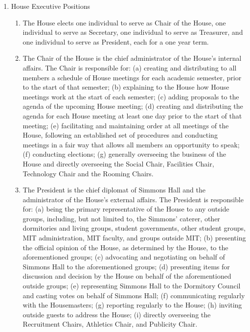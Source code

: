 \documentclass[letterpaper]{article}
\begin{document}
\begin{enumerate}
\begin{enumerate}
\begin{enumerate}
\end{enumerate}

\item House Executive Positions

\begin{enumerate}

\item The House elects one individual to serve as Chair of the House, one individual to serve as Secretary, one individual to serve as Treasurer, and one individual to serve as President, each for a one year term.

\item The Chair of the House is the chief administrator of the House's internal affairs. The Chair is responsible for: (a) creating and distributing to all members a schedule of House meetings for each academic semester, prior to the start of that semester; (b) explaining to the House how House meetings work at the start of each semester; (c) adding proposals to the agenda of the upcoming House meeting; (d) creating and distributing the agenda for each House meeting at least one day prior to the start of that meeting; (e) facilitating and maintaining order at all meetings of the House, following an established set of procedures and conducting meetings in a fair way that allows all members an opportunity to speak; (f) conducting elections; (g) generally overseeing the business of the House and directly overseeing the Social Chair, Facilities Chair, Technology Chair and the Rooming Chairs.

\item The President is the chief diplomat of Simmons Hall and the administrator of the House's external affairs. The President is responsible for: (a) being the primary representative of the House to any outside groups, including, but not limited to, the Simmons' caterer, other dormitories and living groups, student governments, other student groups, MIT administration, MIT faculty, and groups outside MIT; (b) presenting the official opinion of the House, as determined by the House, to the aforementioned groups; (c) advocating and negotiating on behalf of Simmons Hall to the aforementioned groups; (d) presenting items for discussion and decision by the House on behalf of the aforementioned outside groups; (e) representing Simmons Hall to the Dormitory Council and casting votes on behalf of Simmons Hall; (f) communicating regularly with the Housemasters; (g) reporting regularly to the House; (h) inviting outside guests to address the House; (i) directly overseeing the Recruitment Chairs, Athletics Chair, and Publicity Chair.


\end{enumerate}
\end{enumerate}
\end{enumerate}
\end{document}
